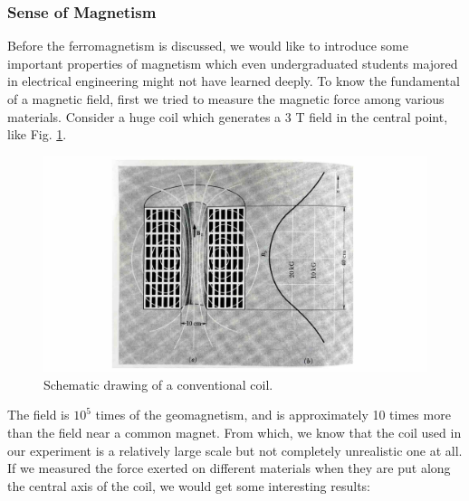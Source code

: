 \subsubsection{Sense of Magnetism}
Before the ferromagnetism is discussed, we would like to introduce some important properties of magnetism which even undergraduated students majored in electrical engineering might not have learned deeply.
To know the fundamental of a magnetic field, first we tried to measure the magnetic force among various materials.
Consider a huge coil which generates a 3 T field in the central point, like Fig. \ref{fig:2_coil}.
\begin{figure}[H]
  \includegraphics[width=18.5cm, bb=9 9 900 500]{./section2Proposal/3TCoil.JPEG}
  \caption{Schematic drawing of a conventional coil.\cite{2_13}}
  \label{fig:2_coil}
\end{figure}
The field is $10^5$ times of the geomagnetism, and is approximately 10 times more than the field near a common magnet.
From which, we know that the coil used in our experiment is a relatively large scale but not completely unrealistic one at all.
If we measured the force exerted on different materials when they are put along the central axis of the coil,
we would get some interesting results:
